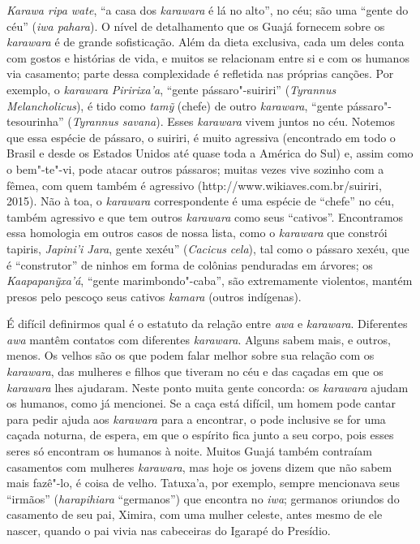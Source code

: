 \emph{Karawa ripa wate}, ``a casa dos \emph{karawara} é lá no alto'', no
céu; são uma ``gente do céu'' (\emph{iwa pahara}). O nível de
detalhamento que os Guajá fornecem sobre os \emph{karawara} é de grande
sofisticação. Além da dieta exclusiva, cada um deles conta com gostos e
histórias de vida, e muitos se relacionam entre si e com os humanos via
casamento; parte dessa complexidade é refletida nas próprias canções.
Por exemplo, o \emph{karawara} \emph{Piririxa'a}, ``gente
pássaro"-suiriri'' (\emph{Tyrannus Melancholicus}), é tido como
\emph{tamỹ} (chefe) de outro \emph{karawara}, ``gente
pássaro"-tesourinha'' (\emph{Tyrannus savana}). Esses \emph{karawara}
vivem juntos no céu. Notemos que essa espécie de pássaro, o suiriri, é
muito agressiva (encontrado em todo o Brasil e desde os Estados Unidos
até quase toda a América do Sul) e, assim como o bem"-te"-vi, pode atacar
outros pássaros; muitas vezes vive sozinho com a fêmea, com quem também
é agressivo (http://www.wikiaves.com.br/suiriri, 2015). Não à toa, o
\emph{karawara} correspondente é uma espécie de ``chefe'' no céu, também
agressivo e que tem outros \emph{karawara} como seus ``cativos''.
Encontramos essa homologia em outros casos de nossa lista, como o
\emph{karawara} que constrói tapiris, \emph{Japini'i Jara}, gente
xexéu'' (\emph{Cacicus} \emph{cela}), tal como o pássaro xexéu, que é
``construtor'' de ninhos em forma de colônias penduradas em árvores; os
\emph{Kaapapanỹxa'á}, ``gente marimbondo"-caba'', são extremamente
violentos, mantém presos pelo pescoço seus cativos \emph{kamara} (outros
indígenas).

É difícil definirmos qual é o estatuto da relação entre \emph{awa} e
\emph{karawara}. Diferentes \emph{awa} mantêm contatos com diferentes
\emph{karawara}. Alguns sabem mais, e outros, menos. Os velhos são os
que podem falar melhor sobre sua relação com os \emph{karawara}, das
mulheres e filhos que tiveram no céu e das caçadas em que os
\emph{karawara} lhes ajudaram. Neste ponto muita gente concorda: os
\emph{karawara} ajudam os humanos, como já mencionei. Se a caça está
difícil, um homem pode cantar para pedir ajuda aos \emph{karawara} para
a encontrar, o pode inclusive se for uma caçada noturna, de espera, em
que o espírito fica junto a seu corpo, pois esses seres só encontram os
humanos à noite. Muitos Guajá também contraíam casamentos com mulheres
\emph{karawara}, mas hoje os jovens dizem que não sabem mais fazê"-lo, é
coisa de velho. Tatuxa'a, por exemplo, sempre mencionava seus ``irmãos''
(\emph{harapihiara} ``germanos'') que encontra no \emph{iwa}; germanos
oriundos do casamento de seu pai, Ximira, com uma mulher celeste, antes
mesmo de ele nascer, quando o pai vivia nas cabeceiras do Igarapé do
Presídio.

